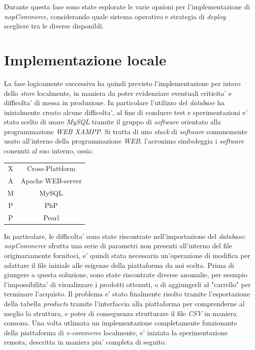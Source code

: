 \documentclass[a4paper]{report}
\begin{document}
		Durante questa fase sono state esplorate le varie opzioni per l'implementazione di \emph{nopCommerce},
		considerando quale sistema operativo e strategia di \emph{deploy} scegliere tra le diverse disponibli.
	\section{Implementazione locale} \label{implementazione_locale}
		La fase logicamente successiva ha quindi previsto l'implementazione per intero dello \emph{store} localmente,
		in maniera da poter evidenziare eventuali criticita' e difficolta' di messa in produzione. In particolare
		l'utilizzo del \emph{database} ha inizialmente creato alcune difficolta', al fine di condurre test e
		sperimentazioni e' stato scelto di usare \emph{MySQL} tramite il gruppo di \emph{software} orientato alla
		programmazione \emph{WEB} \emph{XAMPP}. Si tratta di uno \emph{stack} di \emph{software} comunemente usato
		all'interno della programmazione \emph{WEB}, l'acronimo simboleggia i \emph{software} conenuti al suo interno,
		ossia:
		\begin{center}
			\begin{tabular}{c|c}
				X & Cross-Plattform \\
				A & Apache WEB-server \\
				M & MySQL \\
				P & PhP \\
				P & Pearl \\
			\end{tabular}
		\end{center}
		In particolare, le difficolta' sono state riscontrate nell'importazione del \emph{database}: \emph{nopCommerce}
		sfrutta una serie di parametri non presenti all'interno del file originariamente fornitoci, e' quindi stata
		necessaria un'operazione di modifica per adattare il file iniziale alle esigenze della piattaforma da noi scelta.
		Prima di giungere a questa soluzione, sono state riscontrate diverse anomalie, per esempio l'impossibilita' di
		visualizzare i prodotti ottenuti, o di aggiungerli al "carrello" per terminare l'acquisto.
		Il problema e' stato finalmente risolto tramite l'esportazione della tabella \emph{products} tramite l'interfaccia alla
		piattaforma per comprenderne al meglio la struttura, e poter di conseguenza strutturare il file \emph{CSV} in
		maniera consona.
		Una volta utlimata un implementazione completamente funzionante della piattaforma di \emph{e-commerce}
		localmente, e' iniziata la sperimentazione remota, descritta in maniera piu' completa di seguito.
\end{document}
